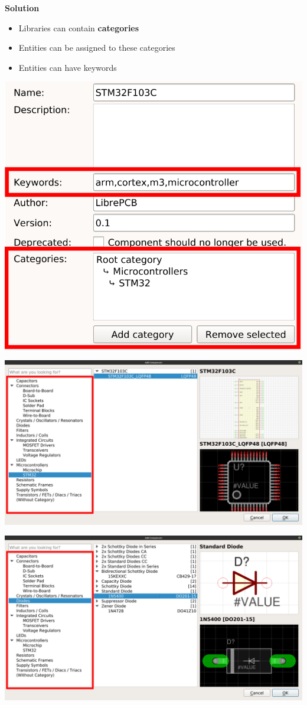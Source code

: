 \begin{frame}{\secname}
  \textbf{Solution}
  \begin{itemize}
    \item Libraries can contain \textbf{categories}
    \item Entities can be assigned to these categories
    \item Entities can have keywords
  \end{itemize}
  \begin{center}
    \includegraphics[width=.45\textwidth]{images/library_keywords_and_categories.png}
  \end{center}
\end{frame}

\begin{frame}[noframenumbering]{\secname}
  \begin{center}
    \includegraphics[width=.95\textwidth]{images/library_browser_categories_stm32.png}
  \end{center}
\end{frame}

\begin{frame}[noframenumbering]{\secname}
  \begin{center}
    \includegraphics[width=.95\textwidth]{images/library_browser_categories_diode.png}
  \end{center}
\end{frame}

